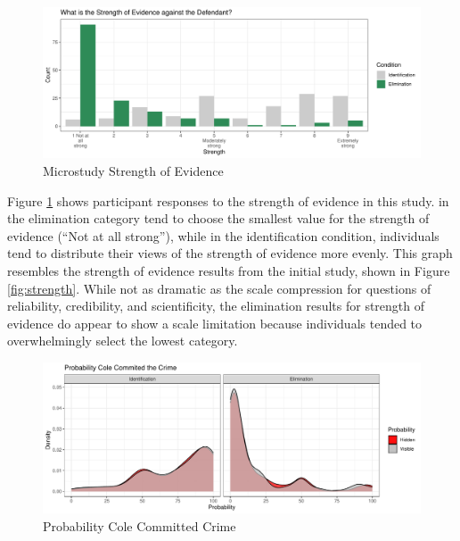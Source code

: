 \documentclass[print]{nuthesis}
\begin{document}
\begin{figure}

{\centering \includegraphics[width=\linewidth]{thesis_files/figure-latex/strength2-1} 

}

\caption{Microstudy Strength of Evidence}\label{fig:strength2}
\end{figure}

Figure \ref{fig:strength2} shows participant responses to the strength of evidence in this study.
 in the elimination category tend to choose the smallest value for the strength of evidence (``Not at all strong''), while in the identification condition, individuals tend to distribute their views of the strength of evidence more evenly.
This graph resembles the strength of evidence results from the initial study, shown in Figure \ref{fig:strength}.
While not as dramatic as the scale compression for questions of reliability, credibility, and scientificity, the elimination results for strength of evidence do appear to show a scale limitation because individuals tended to overwhelmingly select the lowest category.

\begin{figure}

{\centering \includegraphics[width=\linewidth]{thesis_files/figure-latex/prob2-1} 

}

\caption{Probability Cole Committed Crime}\label{fig:prob2}
\end{figure}
\end{document}
